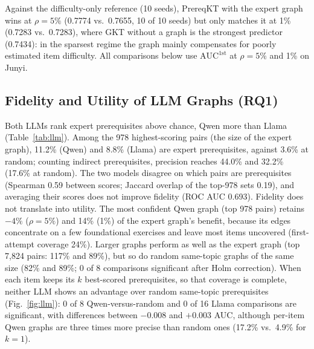 \documentclass[lettersize,journal]{IEEEtran}
\newcommand{\aucfa}{\mathrm{AUC}^{\mathrm{1st}}}
\begin{document}
 Against the difficulty-only reference (10 seeds), PrereqKT with the expert graph wins at $\rho=5\%$ (0.7774 vs.\ 0.7655, 10 of 10 seeds) but only matches it at 1\% (0.7283 vs.\ 0.7283), where GKT without a graph is the strongest predictor (0.7434): in the sparsest regime the graph mainly compensates for poorly estimated item difficulty. All comparisons below use $\aucfa$ at $\rho=5\%$ and 1\% on Junyi.

\subsection{Fidelity and Utility of LLM Graphs (RQ1)}
Both LLMs rank expert prerequisites above chance, Qwen more than Llama (Table~\ref{tab:llm}). Among the 978 highest-scoring pairs (the size of the expert graph), 11.2\% (Qwen) and 8.8\% (Llama) are expert prerequisites, against 3.6\% at random; counting indirect prerequisites, precision reaches 44.0\% and 32.2\% (17.6\% at random). The two models disagree on which pairs are prerequisites (Spearman 0.59 between scores; Jaccard overlap of the top-978 sets 0.19), and averaging their scores does not improve fidelity (ROC AUC 0.693). Fidelity does not translate into utility. The most confident Qwen graph (top 978 pairs) retains $-4\%$ ($\rho=5\%$) and 14\% (1\%) of the expert graph's benefit, because its edges concentrate on a few foundational exercises and leave most items uncovered (first-attempt coverage 24\%). Larger graphs perform as well as the expert graph (top 7{,}824 pairs: 117\% and 89\%), but so do random same-topic graphs of the same size (82\% and 89\%; 0 of 8 comparisons significant after Holm correction). When each item keeps its $k$ best-scored prerequisites, so that coverage is complete, neither LLM shows an advantage over random same-topic prerequisites (Fig.~\ref{fig:llm}): 0 of 8 Qwen-versus-random and 0 of 16 Llama comparisons are significant, with differences between $-0.008$ and $+0.003$ AUC, although per-item Qwen graphs are three times more precise than random ones (17.2\% vs.\ 4.9\% for $k=1$).
\end{document}
